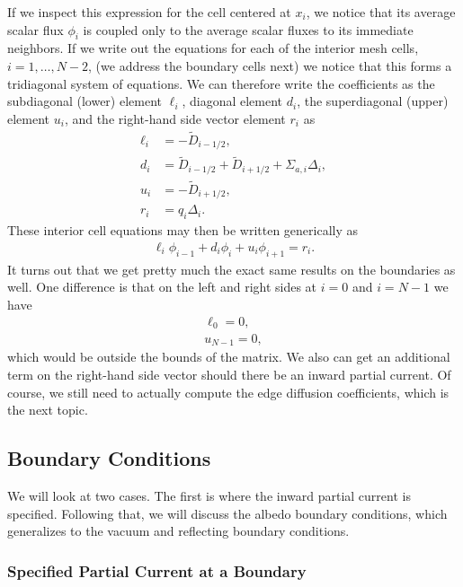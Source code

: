 If we inspect this expression for the cell centered at $x_i$, we notice that its average scalar flux $\phi_i$ is coupled only to the average scalar fluxes to its immediate neighbors. If we write out the equations for each of the interior mesh cells, $i=1, \ldots, N-2$, (we address the boundary cells next) we notice that this forms a tridiagonal system of equations. We can therefore write the coefficients as the subdiagonal (lower) element $\ell_i$, diagonal element $d_i$, the superdiagonal (upper) element $u_i$, and the right-hand side vector element $r_i$ as
\begin{subequations}
\begin{align}
  \ell_i	&= -\widetilde{D}_{i-1/2}, \\
  d_i		&=  \widetilde{D}_{i-1/2} + \widetilde{D}_{i+1/2}  + \Sigma_{a,i} \Delta_i, \\
  u_i		&= -\widetilde{D}_{i+1/2}, \\
  r_i		&=  q_i \Delta_i.
\end{align} 
\end{subequations}
These interior cell equations may then be written generically as
\begin{align}
  \ell_i \phi_{i-1} + d_i \phi_i + u_i \phi_{i+1} = r_i .
\end{align}
It turns out that we get pretty much the exact same results on the boundaries as well. One difference is that on the left and right sides at $i = 0$ and $i = N-1$ we have
\begin{subequations}
\begin{align}
  \ell_0  = 0, \\
  u_{N-1} = 0,
\end{align}
\end{subequations}
which would be outside the bounds of the matrix. We also can get an additional term on the right-hand side vector should there be an inward partial current. Of course, we still need to actually compute the edge diffusion coefficients, which is the next topic.

\subsection{Boundary Conditions}


We will look at two cases. The first is where the inward partial current is specified. Following that, we will discuss the albedo boundary conditions, which generalizes to the vacuum and reflecting boundary conditions.

\subsubsection{Specified Partial Current at a Boundary}


